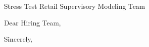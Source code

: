 \documentclass[11pt,a4paper,sans]{moderncv}
\begin{document}
	
	{Stress Test Retail Supervisory Modeling Team}
	\date{\today }
	\opening{Dear Hiring Team,}
	\closing{Sincerely,}
	\makelettertitle
	




\end{document}
